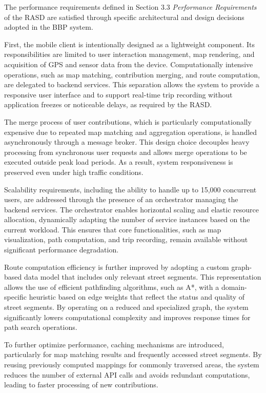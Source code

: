 The performance requirements defined in Section 3.3 \textit{Performance Requirements} of the RASD are satisfied through specific architectural and design decisions adopted in the BBP system.

First, the mobile client is intentionally designed as a lightweight component. Its responsibilities are limited to user interaction management, map rendering, and acquisition of GPS and sensor data from the device. Computationally intensive operations, such as map matching, contribution merging, and route computation, are delegated to backend services. This separation allows the system to provide a responsive user interface and to support real-time trip recording without application freezes or noticeable delays, as required by the RASD.

The merge process of user contributions, which is particularly computationally expensive due to repeated map matching and aggregation operations, is handled asynchronously through a message broker. This design choice decouples heavy processing from synchronous user requests and allows merge operations to be executed outside peak load periods. As a result, system responsiveness is preserved even under high traffic conditions.

Scalability requirements, including the ability to handle up to 15,000 concurrent users, are addressed through the presence of an orchestrator managing the backend services. The orchestrator enables horizontal scaling and elastic resource allocation, dynamically adapting the number of service instances based on the current workload. This ensures that core functionalities, such as map visualization, path computation, and trip recording, remain available without significant performance degradation.

Route computation efficiency is further improved by adopting a custom graph-based data model that includes only relevant street segments. This representation allows the use of efficient pathfinding algorithms, such as A*, with a domain-specific heuristic based on edge weights that reflect the status and quality of street segments. By operating on a reduced and specialized graph, the system significantly lowers computational complexity and improves response times for path search operations.

To further optimize performance, caching mechanisms are introduced, particularly for map matching results and frequently accessed street segments. By reusing previously computed mappings for commonly traversed areas, the system reduces the number of external API calls and avoids redundant computations, leading to faster processing of new contributions.

